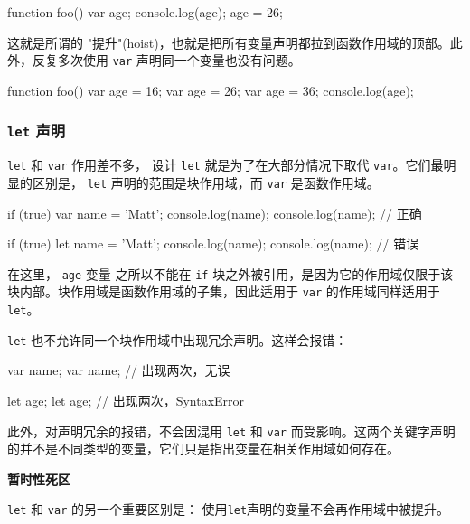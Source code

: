 \begin{JavaScript}
function foo() {
    var age;
    console.log(age);
    age = 26;
}   
\end{JavaScript}

这就是所谓的 "提升"(hoist)，也就是把所有变量声明都拉到函数作用域的顶部。此外，反复多次使用 \texttt{var} 声明同一个变量也没有问题。

\begin{JavaScript}
function foo() {
    var age = 16;
    var age = 26;
    var age = 36;
    console.log(age);
}
\end{JavaScript}

\subsubsection{\texttt{let} 声明}

\texttt{let} 和 \texttt{var} 作用差不多， 设计 \texttt{let} 就是为了在大部分情况下取代 \texttt{var}。它们最明显的区别是， \texttt{let} 声明的范围是块作用域，而 \texttt{var} 是函数作用域。

\begin{JavaScript}
if (true) {
    var name = 'Matt';
    console.log(name);
}
console.log(name);  // 正确
\end{JavaScript}

\begin{JavaScript}
if (true) {
    let name = 'Matt';
    console.log(name);
}
console.log(name);  // 错误
\end{JavaScript}

在这里， \texttt{age} 变量 之所以不能在 \texttt{if} 块之外被引用，是因为它的作用域仅限于该块内部。块作用域是函数作用域的子集，因此适用于 \texttt{var} 的作用域同样适用于 \texttt{let}。

\texttt{let} 也不允许同一个块作用域中出现冗余声明。这样会报错：

\begin{JavaScript}
var name;
var name;   // 出现两次，无误

let age;
let age;    // 出现两次，SyntaxError
\end{JavaScript}

此外，对声明冗余的报错，不会因混用 \texttt{let} 和 \texttt{var} 而受影响。这两个关键字声明的并不是不同类型的变量，它们只是指出变量在相关作用域如何存在。

\noindent\textbf{暂时性死区}

\texttt{let} 和 \texttt{var} 的另一个重要区别是： 使用\texttt{let}声明的变量不会再作用域中被提升。


